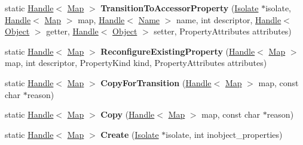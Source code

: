 \begin{DoxyCompactItemize}
\item 
static \hyperlink{classv8_1_1internal_1_1_handle}{Handle}$<$ \hyperlink{classv8_1_1internal_1_1_map}{Map} $>$ {\bfseries Transition\+To\+Accessor\+Property} (\hyperlink{classv8_1_1internal_1_1_isolate}{Isolate} $\ast$isolate, \hyperlink{classv8_1_1internal_1_1_handle}{Handle}$<$ \hyperlink{classv8_1_1internal_1_1_map}{Map} $>$ map, \hyperlink{classv8_1_1internal_1_1_handle}{Handle}$<$ \hyperlink{classv8_1_1internal_1_1_name}{Name} $>$ name, int descriptor, \hyperlink{classv8_1_1internal_1_1_handle}{Handle}$<$ \hyperlink{classv8_1_1internal_1_1_object}{Object} $>$ getter, \hyperlink{classv8_1_1internal_1_1_handle}{Handle}$<$ \hyperlink{classv8_1_1internal_1_1_object}{Object} $>$ setter, Property\+Attributes attributes)\hypertarget{classv8_1_1internal_1_1_map_af12850369dafa2c6ddde70b3ba3c764c}{}\label{classv8_1_1internal_1_1_map_af12850369dafa2c6ddde70b3ba3c764c}

\item 
static \hyperlink{classv8_1_1internal_1_1_handle}{Handle}$<$ \hyperlink{classv8_1_1internal_1_1_map}{Map} $>$ {\bfseries Reconfigure\+Existing\+Property} (\hyperlink{classv8_1_1internal_1_1_handle}{Handle}$<$ \hyperlink{classv8_1_1internal_1_1_map}{Map} $>$ map, int descriptor, Property\+Kind kind, Property\+Attributes attributes)\hypertarget{classv8_1_1internal_1_1_map_a1ce9a5003009050e257b2aa2923e61d1}{}\label{classv8_1_1internal_1_1_map_a1ce9a5003009050e257b2aa2923e61d1}

\item 
static \hyperlink{classv8_1_1internal_1_1_handle}{Handle}$<$ \hyperlink{classv8_1_1internal_1_1_map}{Map} $>$ {\bfseries Copy\+For\+Transition} (\hyperlink{classv8_1_1internal_1_1_handle}{Handle}$<$ \hyperlink{classv8_1_1internal_1_1_map}{Map} $>$ map, const char $\ast$reason)\hypertarget{classv8_1_1internal_1_1_map_ab1eb7800b3f4a70cc5304c8c3f950c7b}{}\label{classv8_1_1internal_1_1_map_ab1eb7800b3f4a70cc5304c8c3f950c7b}

\item 
static \hyperlink{classv8_1_1internal_1_1_handle}{Handle}$<$ \hyperlink{classv8_1_1internal_1_1_map}{Map} $>$ {\bfseries Copy} (\hyperlink{classv8_1_1internal_1_1_handle}{Handle}$<$ \hyperlink{classv8_1_1internal_1_1_map}{Map} $>$ map, const char $\ast$reason)\hypertarget{classv8_1_1internal_1_1_map_a5df3fa381c468b6158fbd03335a05a39}{}\label{classv8_1_1internal_1_1_map_a5df3fa381c468b6158fbd03335a05a39}

\item 
static \hyperlink{classv8_1_1internal_1_1_handle}{Handle}$<$ \hyperlink{classv8_1_1internal_1_1_map}{Map} $>$ {\bfseries Create} (\hyperlink{classv8_1_1internal_1_1_isolate}{Isolate} $\ast$isolate, int inobject\+\_\+properties)\hypertarget{classv8_1_1internal_1_1_map_a0190d1c4f6fe4adec7b0719e448d5199}{}\label{classv8_1_1internal_1_1_map_a0190d1c4f6fe4adec7b0719e448d5199}


\end{DoxyCompactItemize}
